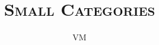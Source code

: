 \documentclass[12pt, a4paper]{report}
\theoremstyle{definition}
\theoremstyle{remark}
\begin{document}
\title{\scshape \bfseries Small Categories}
\author{VM}
\date{}
\maketitle

\begingroup
\let\clearpage\relax
\tableofcontents
\endgroup

%

\clearpage

%



\end{document}
